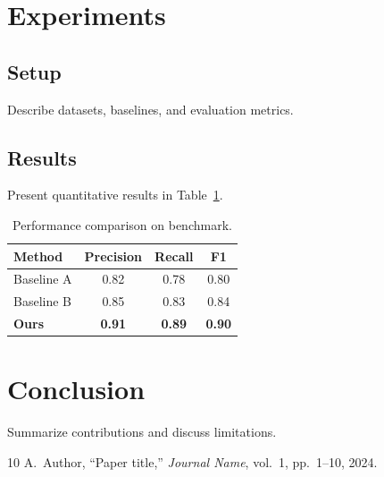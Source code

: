 \documentclass[conference]{IEEEtran}
\begin{document}
\section{Experiments}
\label{sec:experiments}

\subsection{Setup}
Describe datasets, baselines, and evaluation metrics.

\subsection{Results}
Present quantitative results in Table~\ref{tab:results}.

\begin{table}[htbp]
\caption{Performance comparison on benchmark.}
\label{tab:results}
\centering
\begin{tabular}{lccc}
\toprule
Method & Precision & Recall & F1 \\
\midrule
Baseline A & 0.82 & 0.78 & 0.80 \\
Baseline B & 0.85 & 0.83 & 0.84 \\
\textbf{Ours} & \textbf{0.91} & \textbf{0.89} & \textbf{0.90} \\
\bottomrule
\end{tabular}
\end{table}

\section{Conclusion}
\label{sec:conclusion}
Summarize contributions and discuss limitations.


\begin{thebibliography}{10}
 A.~Author, ``Paper title,'' \textit{Journal Name}, vol.~1, pp.~1--10, 2024.
\end{thebibliography}
\end{document}
